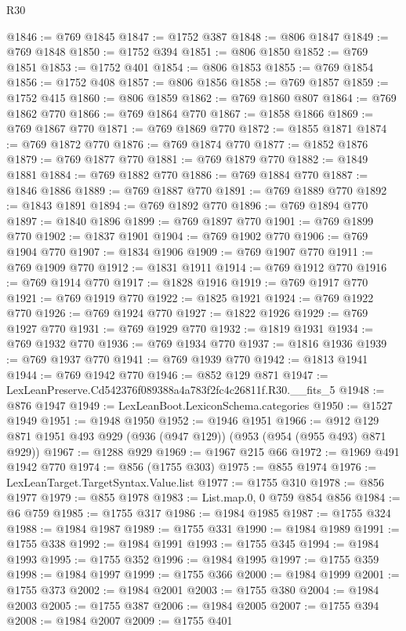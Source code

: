 \begin{lexlean}{R30}
\begin{coremodule}
@1846 := @769 @1845
@1847 := @1752 @387
@1848 := @806 @1847
@1849 := @769 @1848
@1850 := @1752 @394
@1851 := @806 @1850
@1852 := @769 @1851
@1853 := @1752 @401
@1854 := @806 @1853
@1855 := @769 @1854
@1856 := @1752 @408
@1857 := @806 @1856
@1858 := @769 @1857
@1859 := @1752 @415
@1860 := @806 @1859
@1862 := @769 @1860 @807
@1864 := @769 @1862 @770
@1866 := @769 @1864 @770
@1867 := @1858 @1866
@1869 := @769 @1867 @770
@1871 := @769 @1869 @770
@1872 := @1855 @1871
@1874 := @769 @1872 @770
@1876 := @769 @1874 @770
@1877 := @1852 @1876
@1879 := @769 @1877 @770
@1881 := @769 @1879 @770
@1882 := @1849 @1881
@1884 := @769 @1882 @770
@1886 := @769 @1884 @770
@1887 := @1846 @1886
@1889 := @769 @1887 @770
@1891 := @769 @1889 @770
@1892 := @1843 @1891
@1894 := @769 @1892 @770
@1896 := @769 @1894 @770
@1897 := @1840 @1896
@1899 := @769 @1897 @770
@1901 := @769 @1899 @770
@1902 := @1837 @1901
@1904 := @769 @1902 @770
@1906 := @769 @1904 @770
@1907 := @1834 @1906
@1909 := @769 @1907 @770
@1911 := @769 @1909 @770
@1912 := @1831 @1911
@1914 := @769 @1912 @770
@1916 := @769 @1914 @770
@1917 := @1828 @1916
@1919 := @769 @1917 @770
@1921 := @769 @1919 @770
@1922 := @1825 @1921
@1924 := @769 @1922 @770
@1926 := @769 @1924 @770
@1927 := @1822 @1926
@1929 := @769 @1927 @770
@1931 := @769 @1929 @770
@1932 := @1819 @1931
@1934 := @769 @1932 @770
@1936 := @769 @1934 @770
@1937 := @1816 @1936
@1939 := @769 @1937 @770
@1941 := @769 @1939 @770
@1942 := @1813 @1941
@1944 := @769 @1942 @770
@1946 := @852 @129 @871
@1947 := LexLeanPreserve.Cd542376f089388a4a783f2fc4c26811f.R30.__fits_5
@1948 := @876 @1947
@1949 := LexLeanBoot.LexiconSchema.categories
@1950 := @1527 @1949
@1951 := @1948 @1950
@1952 := @1946 @1951
@1966 := @912 @129 @871 @1951 @493 @929 (@936 (@947 @129)) (@953 (@954 (@955 @493) @871 @929))
@1967 := @1288 @929
@1969 := @1967 @215 @66
@1972 := @1969 @491 @1942 @770
@1974 := @856 (@1755 @303)
@1975 := @855 @1974
@1976 := LexLeanTarget.TargetSyntax.Value.list
@1977 := @1755 @310
@1978 := @856 @1977
@1979 := @855 @1978
@1983 := List.map.{0, 0} @759 @854 @856
@1984 := @6 @759
@1985 := @1755 @317
@1986 := @1984 @1985
@1987 := @1755 @324
@1988 := @1984 @1987
@1989 := @1755 @331
@1990 := @1984 @1989
@1991 := @1755 @338
@1992 := @1984 @1991
@1993 := @1755 @345
@1994 := @1984 @1993
@1995 := @1755 @352
@1996 := @1984 @1995
@1997 := @1755 @359
@1998 := @1984 @1997
@1999 := @1755 @366
@2000 := @1984 @1999
@2001 := @1755 @373
@2002 := @1984 @2001
@2003 := @1755 @380
@2004 := @1984 @2003
@2005 := @1755 @387
@2006 := @1984 @2005
@2007 := @1755 @394
@2008 := @1984 @2007
@2009 := @1755 @401

\end{coremodule}
\end{lexlean}

